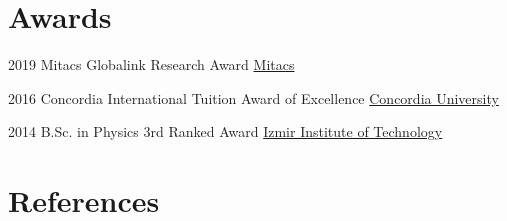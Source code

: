 \documentclass[]{friggeri-cv}
\begin{document}
\newpage

\section{Awards}

\begin{entrylist}
	
\entry
{2019}
{Mitacs Globalink Research Award}
{\href{https://www.mitacs.ca/en/programs/globalink/globalink-research-award}{Mitacs}} 	
	
	


\entry
{2016}
{Concordia International Tuition Award of Excellence}
{\href{http://www.concordia.ca}{Concordia University}} 	


\entry
{2014}
{B.Sc. in Physics 3rd Ranked Award}
{\href{http://www.iyte.edu.tr/AnaSayfa.aspx?d=ENG}{Izmir Institute of Technology}} 	
	
	
\end{entrylist}	
	

\section{References}
	
\end{document}
